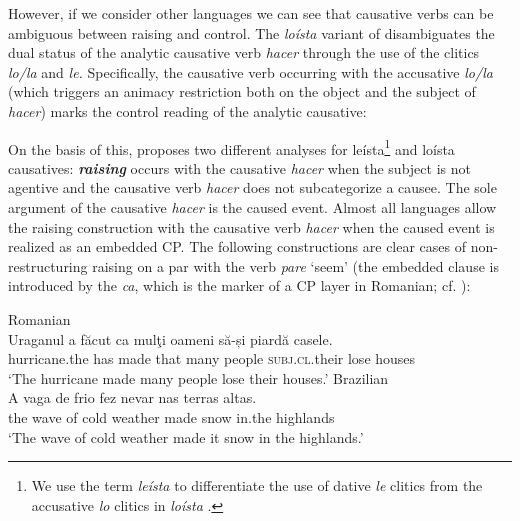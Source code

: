 \documentclass[output=paper]{langsci/langscibook}
\begin{document}
However, if we consider other languages we can see that causative verbs can be ambiguous between raising and control. The \textit{loísta} variant of  disambiguates the dual status of the analytic causative verb \textit{hacer} through the use of the clitics \textit{lo\slash la} and \textit{le.} Specifically, the causative verb occurring with the accusative \textit{lo\slash la} (which triggers an animacy restriction both on the object and the subject of \textit{hacer}) marks the control reading of the analytic causative:

\ea%
    \label{ex:moreno:7}
    \z
\z


On the basis of this, \citet{Torrego2010} proposes two different analyses for leísta\footnote{We use the term \textit{leísta} to differentiate the use of dative \textit{le} clitics from the accusative \textit{lo} clitics in \textit{loísta} .} and loísta causatives: \textbf{\textit{raising}} occurs with the causative \textit{hacer} when the subject is not agentive and the causative verb \textit{hacer} does not subcategorize a causee. The sole argument of the causative \textit{hacer} is the caused event. Almost all  languages allow the raising construction with the causative verb \textit{hacer} when the caused event is realized as an embedded CP. The following constructions are clear cases of non-restructuring raising on a par with the verb \textit{pare} ‘seem’ (the embedded clause is introduced by the  \textit{ca}, which is the marker of a CP layer in Romanian; cf. \citealt{Alboiu2007}):

\ea%
    \label{ex:moreno:8}
    \ea  Romanian\\
    \gll Uraganul    a    făcut   ca   mulţi  oameni  să-și              piardă casele.   \\
         hurricane.the has made  that many people   \textsc{subj.cl}.their lose     houses \\
    \glt ‘The hurricane made many people lose their houses.’
    \ex  Brazilian \\
    \gll A   vaga  de frio     fez   nevar   nas     terras altas.  \\
         the wave of cold weather   made  snow  in.the highlands\\
    \glt ‘The wave of cold weather made it snow in the highlands.’ 
    \z
\z
\end{document}
